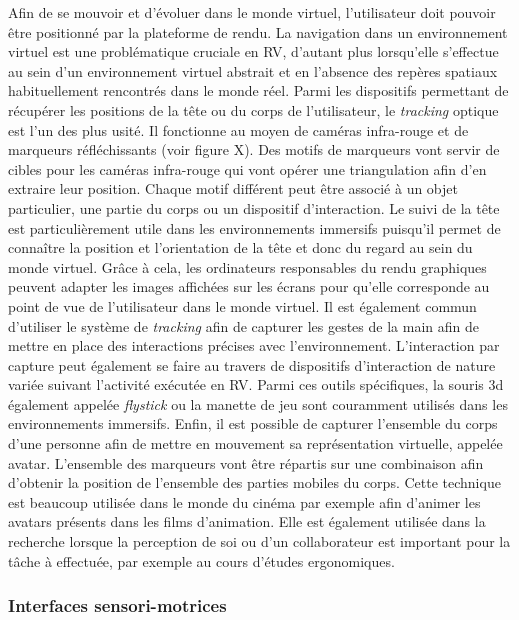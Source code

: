 Afin de se mouvoir et d'évoluer dans le monde virtuel, l'utilisateur doit pouvoir être positionné par la plateforme de rendu. La navigation dans un environnement virtuel est une problématique cruciale en RV, d'autant plus lorsqu'elle s'effectue au sein d'un environnement virtuel abstrait et en l'absence des repères spatiaux habituellement rencontrés dans le monde réel.
Parmi les dispositifs permettant de récupérer les positions de la tête ou du corps de l'utilisateur, le \textit{tracking} optique est l'un des plus usité. Il fonctionne au moyen de caméras infra-rouge et de marqueurs réfléchissants (voir figure X). Des motifs de marqueurs vont servir de cibles pour les caméras infra-rouge qui vont opérer une triangulation afin d'en extraire leur position. Chaque motif différent peut être associé à un objet particulier, une partie du corps ou un dispositif d'interaction. Le suivi de la tête est particulièrement utile dans les environnements immersifs puisqu'il permet de connaître la position et l’orientation de la tête et donc du regard au sein du monde virtuel. Grâce à cela, les ordinateurs responsables du rendu graphiques peuvent adapter les images affichées sur les écrans pour qu'elle corresponde au point de vue de l'utilisateur dans le monde virtuel.
Il est également commun d'utiliser le système de \textit{tracking} afin de capturer les gestes de la main afin de mettre en place des interactions précises avec l'environnement. L'interaction par capture peut également se faire au travers de dispositifs d'interaction de nature variée suivant l'activité exécutée en RV. Parmi ces outils spécifiques, la souris 3d également appelée \textit{flystick} ou la manette de jeu sont couramment utilisés dans les environnements immersifs.
Enfin, il est possible de capturer l'ensemble du corps d'une personne afin de mettre en mouvement sa représentation virtuelle, appelée avatar. L'ensemble des marqueurs vont être répartis sur une combinaison afin d'obtenir la position de l'ensemble des parties mobiles du corps. Cette technique est beaucoup utilisée dans le monde du cinéma par exemple afin d'animer les avatars présents dans les films d'animation. Elle est également utilisée dans la recherche lorsque la perception de soi ou d'un collaborateur est important pour la tâche à effectuée, par exemple au cours d'études ergonomiques.

\subsubsection{Interfaces sensori-motrices} \label{interface_sensor-motor}

